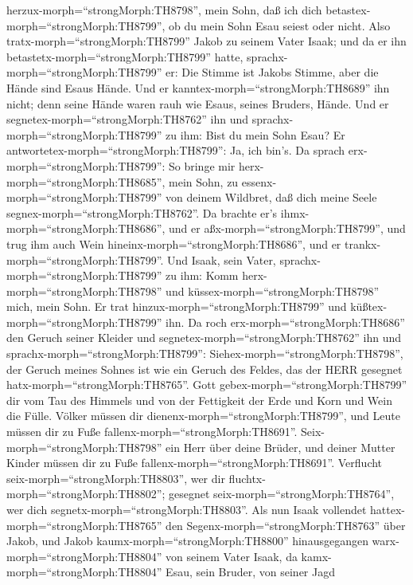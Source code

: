 herzux-morph=``strongMorph:TH8798'', mein Sohn, daß ich dich
betastex-morph=``strongMorph:TH8799'', ob du mein Sohn Esau seiest oder
nicht.  Also tratx-morph=``strongMorph:TH8799'' Jakob zu
seinem Vater Isaak; und da er ihn betastetx-morph=``strongMorph:TH8799''
hatte, sprachx-morph=``strongMorph:TH8799'' er: Die Stimme ist Jakobs
Stimme, aber die Hände sind Esaus Hände.  Und er
kanntex-morph=``strongMorph:TH8689'' ihn nicht; denn seine Hände waren
rauh wie Esaus, seines Bruders, Hände. Und er
segnetex-morph=``strongMorph:TH8762'' ihn  und
sprachx-morph=``strongMorph:TH8799'' zu ihm: Bist du mein Sohn Esau? Er
antwortetex-morph=``strongMorph:TH8799'': Ja, ich bin's. 
Da sprach erx-morph=``strongMorph:TH8799'': So bringe mir
herx-morph=``strongMorph:TH8685'', mein Sohn, zu
essenx-morph=``strongMorph:TH8799'' von deinem Wildbret, daß dich meine
Seele segnex-morph=``strongMorph:TH8762''. Da brachte er's
ihmx-morph=``strongMorph:TH8686'', und er
aßx-morph=``strongMorph:TH8799'', und trug ihm auch Wein
hineinx-morph=``strongMorph:TH8686'', und er
trankx-morph=``strongMorph:TH8799''.  Und Isaak, sein
Vater, sprachx-morph=``strongMorph:TH8799'' zu ihm: Komm
herx-morph=``strongMorph:TH8798'' und
küssex-morph=``strongMorph:TH8798'' mich, mein Sohn.  Er
trat hinzux-morph=``strongMorph:TH8799'' und
küßtex-morph=``strongMorph:TH8799'' ihn. Da roch
erx-morph=``strongMorph:TH8686'' den Geruch seiner Kleider und
segnetex-morph=``strongMorph:TH8762'' ihn und
sprachx-morph=``strongMorph:TH8799'':
Siehex-morph=``strongMorph:TH8798'', der Geruch meines Sohnes ist wie
ein Geruch des Feldes, das der HERR gesegnet
hatx-morph=``strongMorph:TH8765''.  Gott
gebex-morph=``strongMorph:TH8799'' dir vom Tau des Himmels und von der
Fettigkeit der Erde und Korn und Wein die Fülle.  Völker
müssen dir dienenx-morph=``strongMorph:TH8799'', und Leute müssen dir zu
Fuße fallenx-morph=``strongMorph:TH8691''.
Seix-morph=``strongMorph:TH8798'' ein Herr über deine Brüder, und deiner
Mutter Kinder müssen dir zu Fuße fallenx-morph=``strongMorph:TH8691''.
Verflucht seix-morph=``strongMorph:TH8803'', wer dir
fluchtx-morph=``strongMorph:TH8802''; gesegnet
seix-morph=``strongMorph:TH8764'', wer dich
segnetx-morph=``strongMorph:TH8803''.  Als nun Isaak
vollendet hattex-morph=``strongMorph:TH8765'' den
Segenx-morph=``strongMorph:TH8763'' über Jakob, und Jakob
kaumx-morph=``strongMorph:TH8800'' hinausgegangen
warx-morph=``strongMorph:TH8804'' von seinem Vater Isaak, da
kamx-morph=``strongMorph:TH8804'' Esau, sein Bruder, von seiner Jagd
